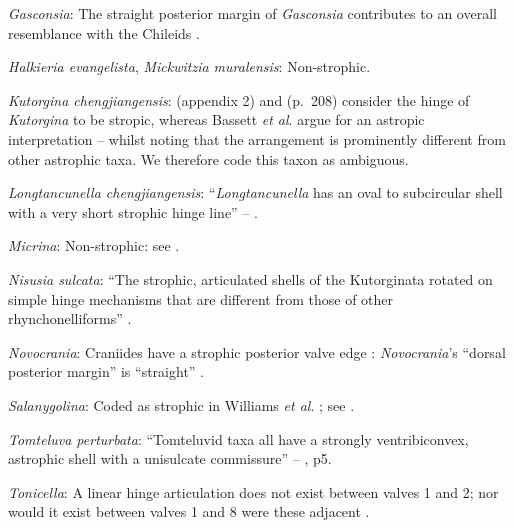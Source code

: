 \documentclass[openany]{book}
\begin{document}
\hypertarget{Gasconsia-coding-70}{}
\emph{Gasconsia}: The straight posterior margin of \emph{Gasconsia}
contributes to an overall resemblance with the Chileids
\citep{Holmer2014OrdovicianSilurian}.

\hypertarget{Halkieria_evangelista-coding-70}{}
\emph{Halkieria evangelista}, \emph{Mickwitzia muralensis}:
Non-strophic.

\hypertarget{Kutorgina_chengjiangensis-coding-70}{}
\emph{Kutorgina chengjiangensis}: \citet{Williams1998Thediversity}
(appendix 2) and \citet{Williams2000LinguliformeaCraniiformea} (p.~208)
consider the hinge of \emph{Kutorgina} to be stropic, whereas Bassett
\emph{et al}. \citeyearpar{Bassett2001Functionalmorphology} argue for an
astropic interpretation -- whilst noting that the arrangement is
prominently different from other astrophic taxa. We therefore code this
taxon as ambiguous.

\hypertarget{Longtancunella_chengjiangensis-coding-70}{}
\emph{Longtancunella chengjiangensis}: ``\emph{Longtancunella} has an
oval to subcircular shell with a very short strophic hinge line'' --
\citet{Zhang2011Theexceptionally}.

\hypertarget{Micrina-coding-70}{}
\emph{Micrina}: Non-strophic: see \citet{Holmer2008TheEarly}.

\hypertarget{Nisusia_sulcata-coding-70}{}
\emph{Nisusia sulcata}: ``The strophic, articulated shells of the
Kutorginata rotated on simple hinge mechanisms that are different from
those of other rhynchonelliforms''
\citep[p.~208]{Williams2000LinguliformeaCraniiformea}.

\hypertarget{Novocrania-coding-70}{}
\emph{Novocrania}: Craniides have a strophic posterior valve edge
\citep[table 39 on p.~2853]{Williams2007Supplement}: \emph{Novocrania}'s
``dorsal posterior margin'' is ``straight''
\citep[p.~171]{Williams2000LinguliformeaCraniiformea}.

\hypertarget{Salanygolina-coding-70}{}
\emph{Salanygolina}: Coded as strophic in Williams \emph{et al}.
\citeyearpar{Williams1998Thediversity}; see
\citet{Holmer2009Theenigmatic}.

\hypertarget{Tomteluva_perturbata-coding-70}{}
\emph{Tomteluva perturbata}: ``Tomteluvid taxa all have a strongly
ventribiconvex, astrophic shell with a unisulcate commissure'' --
\citet{Streng2016Anew}, p5.

\hypertarget{Tonicella-coding-70}{}
\emph{Tonicella}: A linear hinge articulation does not exist between
valves 1 and 2; nor would it exist between valves 1 and 8 were these
adjacent \citep{Connors2012}.
\end{document}
